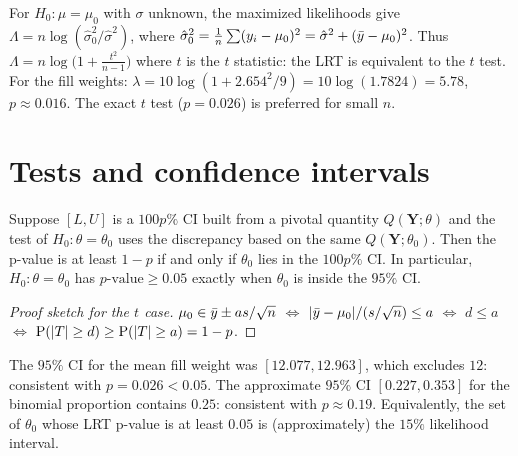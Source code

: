 \begin{example}
For $H_0:\mu=\mu_0$ with $\sigma$ unknown, the maximized likelihoods give
$\Lambda = n\log(\hat\sigma_0^2/\hat\sigma^2)$, where $\hat\sigma_0^2 = \frac1n\sum(y_i-\mu_0)^2
= \hat\sigma^2 + (\bar{y}-\mu_0)^2$. Thus $\Lambda = n\log\big(1 + \frac{t^2}{n-1}\big)$
where $t$ is the $t$ statistic: the LRT is equivalent to the $t$ test. For the fill
weights: $\lambda = 10\log(1 + 2.654^2/9) = 10\log(1.7824) = 5.78$, $p\approx 0.016$.
The exact $t$ test ($p=0.026$) is preferred for small $n$.
\end{example}

\section{Tests and confidence intervals}

\begin{theorem}[Duality]
Suppose $[L,U]$ is a $100p\%$ CI built from a pivotal quantity $Q(\mathbf Y;\theta)$
and the test of $H_0:\theta=\theta_0$ uses the discrepancy based on the same
$Q(\mathbf Y;\theta_0)$. Then the p-value is at least $1-p$ if and only if $\theta_0$
lies in the $100p\%$ CI. In particular, $H_0:\theta=\theta_0$ has $p\text{-value}\ge 0.05$
exactly when $\theta_0$ is inside the $95\%$ CI.
\end{theorem}
\begin{proof}[Proof sketch for the $t$ case]
$\mu_0\in\bar{y}\pm a s/\sqrt n$ $\iff$ $|\bar{y}-\mu_0|/(s/\sqrt n)\le a$ $\iff$
$d\le a$ $\iff$ $\operatorname{P}(|T|\ge d)\ge\operatorname{P}(|T|\ge a) = 1-p$.
\end{proof}

\begin{example}
The $95\%$ CI for the mean fill weight was $[12.077,12.963]$, which excludes $12$:
consistent with $p=0.026<0.05$. The approximate $95\%$ CI $[0.227, 0.353]$ for the
binomial proportion contains $0.25$: consistent with $p\approx0.19$. Equivalently, the
set of $\theta_0$ whose LRT p-value is at least $0.05$ is (approximately) the $15\%$
likelihood interval.
\end{example}

\begin{center}
\end{center}

